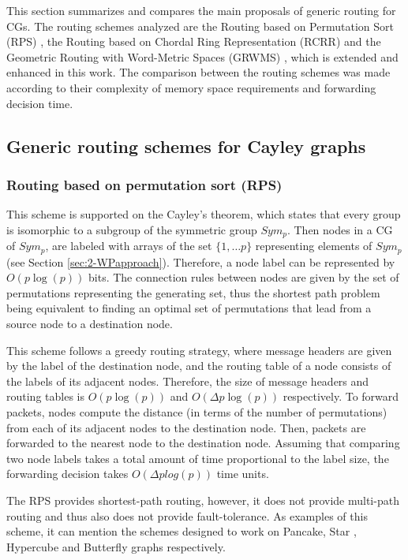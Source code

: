  This section summarizes and
compares the main proposals of generic routing for CGs. The routing schemes analyzed are the Routing based on Permutation Sort (RPS) \cite{nets_cg_model}, the Routing based on Chordal Ring Representation (RCRR) \cite{Tang92} and the Geometric Routing with Word-Metric Spaces (GRWMS) \cite{Camelo14}, which is extended and enhanced in this work. The comparison between the routing schemes was made  according to their complexity of memory space requirements and forwarding decision time.

\subsection{Generic routing schemes for Cayley graphs}

\subsubsection{Routing based on permutation sort (RPS)} 
This scheme is supported on the Cayley's theorem, which states that every group is isomorphic to a subgroup of the symmetric group $Sym_p$. Then nodes in a CG of $Sym_p$, are labeled with arrays of the set $\{1,\ldots p\}$ representing elements of $Sym_p$ (see Section \ref{sec:2-WPapproach}). Therefore, a node label can be represented by $O(p\log(p))$ bits. 
The connection rules between nodes are given by the set of permutations representing the generating set, thus the shortest path problem being equivalent to finding an optimal set of permutations that lead from a source node to a destination node. 

This scheme follows a greedy routing strategy, where message headers are given by the label of the destination node, and the routing table of a node consists of the labels of its adjacent nodes. Therefore, the size of message headers and routing tables is $O(p\log(p))$ and $O(\Delta p\log(p))$ respectively. To forward packets, nodes compute the distance (in terms of the number of permutations) from each of its adjacent nodes to the destination node. 
Then, packets are forwarded to the nearest node to the destination node. Assuming that comparing two node labels takes a total amount of time proportional to the label size, the forwarding decision takes $O(\Delta p log(p))$ time units.

The RPS provides shortest-path routing, however, it does not provide multi-path routing and thus also does not provide fault-tolerance. As examples of this scheme, it can mention the schemes designed to work on Pancake, Star \cite{nets_cg_model}, Hypercube and Butterfly graphs \cite{hyp_but} respectively. 

